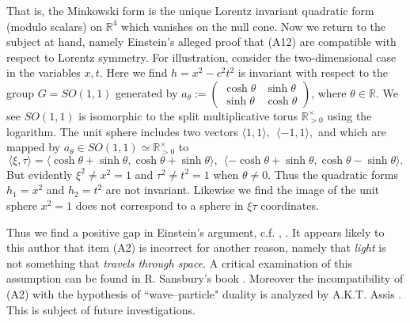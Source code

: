 \documentclass[12pt]{amsart}
\theoremstyle{definition}
\theoremstyle{remark}
\newcommand{\bR}{\mathbb{R}}
\newcommand{\del}{\partial}
\begin{document}
That is, the Minkowski form is the unique Lorentz invariant quadratic form (modulo scalars) on $\bR^4$ which vanishes on the null cone. Now we return to the subject at hand, namely Einstein's alleged proof that (A12) are compatible with respect to Lorentz symmetry. For illustration, consider the two-dimensional case in the variables $x,t$. Here we find $h=x^2-c^2 t^2$ is invariant with respect to the group $G=SO(1,1)$ generated by $a_\theta:=\begin{pmatrix} \cosh \theta & \sinh \theta \\
\sinh \theta & \cosh \theta
\end{pmatrix}$, where $\theta\in \bR$. We see $SO(1,1)$ is isomorphic to the split multiplicative torus $\bR^\times _{>0}$ using the logarithm. The unit sphere includes two vectors $\langle 1, 1 \rangle,~~ \langle -1,1\rangle,$ and which are mapped by $a_\theta \in SO(1,1) \simeq \bR^\times_{>0}$ to $$\langle \xi,\tau\rangle=\langle \cosh \theta+\sinh \theta, \cosh \theta+\sinh \theta \rangle,~~ \langle -\cosh \theta+\sinh \theta, \cosh \theta-\sinh \theta \rangle.$$ But evidently $\xi^2 \neq x^2=1$ and $\tau^2 \neq t^2=1$ when $\theta\neq 0$. Thus the quadratic forms $h_1=x^2$ and $h_2=t^2$ are not invariant. Likewise we find the image of the unit sphere $x^2=1$ does not correspond to a sphere in $\xi \tau$ coordinates. %

Thus we find a positive gap in Einstein's argument, c.f. \cite{bryant}, \cite{crothers}. It appears likely to this author that item (A2) is incorrect for another reason, namely that \emph{light} is not something that \emph{travels through space}. A critical examination of this assumption can be found in R. Sansbury's book \cite{sansburyspeed}. Moreover the incompatibility of (A2) with the hypothesis of ``wave--particle" duality is analyzed by A.K.T. Assis \cite[\S 7.2.4, pp.133]{assis1999relational}. This is subject of future investigations.
\end{document}
